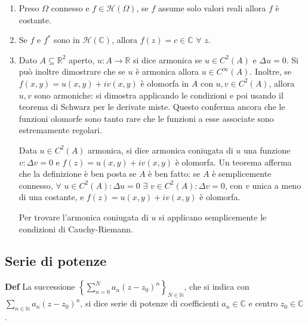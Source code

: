 \documentclass{article}
\begin{document}
\begin{enumerate}
\item Preso $\Omega $ connesso e $f\in \mathcal{H}\left( \Omega \right) $,
se $f$ assume solo valori reali allora $f$ \`{e} costante.

\item Se $f$ e $f^{\ast }$ sono in $\mathcal{H}\left( 
\mathbb{C}
\right) $, allora $f\left( z\right) =c\in 
\mathbb{C}
$ $\forall $ $z$.

\item Dato $A\subseteq 
\mathbb{R}
^{2}$ aperto, $u:A\rightarrow 
\mathbb{R}
$ si dice armonica se $u\in C^{2}\left( A\right) $ e $\Delta u=0$. Si pu\`{o}
inoltre dimostrare che se $u$ \`{e} armonica allora $u\in C^{\infty }\left(
A\right) $. Inoltre, se $f\left( x,y\right) =u\left( x,y\right) +iv\left(
x,y\right) $ \`{e} olomorfa in $A$ con $u,v\in C^{2}\left( A\right) $,
allora $u,v$ sono armoniche: si dimostra applicando le condizioni e poi
usando il teorema di Schwarz per le derivate miste. Questo conferma ancora
che le funzioni olomorfe sono tanto rare che le funzioni a esse associate
sono estremamente regolari.

Data $u\in C^{2}\left( A\right) $ armonica, si dice armonica coniugata di $u$
una funzione $v:\Delta v=0$ e $f\left( z\right) =u\left( x,y\right)
+iv\left( x,y\right) $ \`{e} olomorfa. Un teorema afferma che la definizione 
\`{e} ben posta se $A$ \`{e} ben fatto: se $A$ \`{e} semplicemente connesso, 
$\forall $ $u\in C^{2}\left( A\right) :\Delta u=0$ $\exists $ $v\in
C^{2}\left( A\right) :\Delta v=0$, con $v$ unica a meno di una costante, e $%
f\left( z\right) =u\left( x,y\right) +iv\left( x,y\right) $ \`{e} olomorfa.

Per trovare l'armonica coniugata di $u$ si applicano semplicemente le
condizioni di Cauchy-Riemann.
\end{enumerate}

\subsection{Serie di potenze}

\textbf{Def }La successione $\left\{ \sum_{n=0}^{N}a_{n}\left(
z-z_{0}\right) ^{n}\right\} _{N\in 
\mathbb{N}
}$, che si indica con $\sum_{n\in 
\mathbb{N}
}a_{n}\left( z-z_{0}\right) ^{n}$, si dice serie di potenze di coefficienti $%
a_{n}\in 
\mathbb{C}
$ e centro $z_{0}\in 
\mathbb{C}
$.
\end{document}
